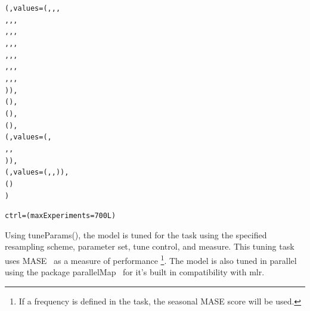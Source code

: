 \documentclass[12pt]{article}%
\makeatletter
\theoremstyle{definition}
\newcommand\code{\@codex}
\def\@codex#1{{\normalfont\ttfamily\hyphenchar\font=-1 #1}}
\newcommand{\pkg}[1]{{\fontseries{b}\selectfont #1}}
\makeatother
\begin{document}
\singlespacing
\begin{knitrout}
\color{fgcolor}\begin{kframe}
\begin{alltt}
  (, values = (, , ,
                                        , , ,
                                        , , ,
                                        , , ,
                                        , , ,
                                        , , ,
                                        , , ,
                                        )),
  (),
  (),
  (),
  (, values = (,
                                           , ,
                                           )),
  (, values = (, , )),
  ()
)

ctrl = (maxExperiments = 700L)
\end{alltt}
\end{kframe}
\end{knitrout}
\doublespacing

Using \code{tuneParams()}, the model is tuned for the task using the specified resampling scheme, parameter set, tune control, and measure. This tuning task uses MASE~\cite{Hyndman2006} as a measure of performance \footnote{If a frequency is defined in the task, the seasonal MASE score will be used.}. The model is also tuned in parallel using the package \pkg{parallelMap}~\cite{parallel} for it's built in compatibility with \pkg{mlr}.
\end{document}
